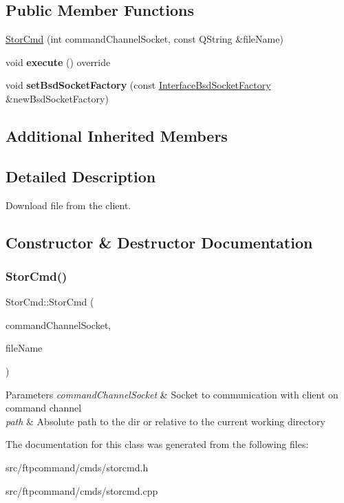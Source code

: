 \subsection*{Public Member Functions}
\begin{DoxyCompactItemize}
\item 
\hyperlink{classStorCmd_a01f911cad15cc9ee4700edf263390489}{Stor\+Cmd} (int command\+Channel\+Socket, const Q\+String \&file\+Name)
\item 
\mbox{\label{classStorCmd_a6ec9900d7df7a0d2194102c146c7ef0e}} 
void {\bfseries execute} () override
\item 
\mbox{\label{classStorCmd_a8e6d58c7263f7a2be1184c32debac379}} 
void {\bfseries set\+Bsd\+Socket\+Factory} (const \hyperlink{classInterfaceBsdSocketFactory}{Interface\+Bsd\+Socket\+Factory} \&new\+Bsd\+Socket\+Factory)
\end{DoxyCompactItemize}
\subsection*{Additional Inherited Members}


\subsection{Detailed Description}
Download file from the client. 

\subsection{Constructor \& Destructor Documentation}
\mbox{\label{classStorCmd_a01f911cad15cc9ee4700edf263390489}} 
\subsubsection{\texorpdfstring{Stor\+Cmd()}{StorCmd()}}
{\footnotesize\ttfamily Stor\+Cmd\+::\+Stor\+Cmd (\begin{DoxyParamCaption}\item[{int}]{command\+Channel\+Socket,  }\item[{const Q\+String \&}]{file\+Name }\end{DoxyParamCaption})}


\begin{DoxyParams}{Parameters}
{\em command\+Channel\+Socket} & Socket to communication with client on command channel \\
\hline
{\em path} & Absolute path to the dir or relative to the current working directory \\
\hline
\end{DoxyParams}


The documentation for this class was generated from the following files\+:\begin{DoxyCompactItemize}
\item 
src/ftpcommand/cmds/storcmd.\+h\item 
src/ftpcommand/cmds/storcmd.\+cpp\end{DoxyCompactItemize}
